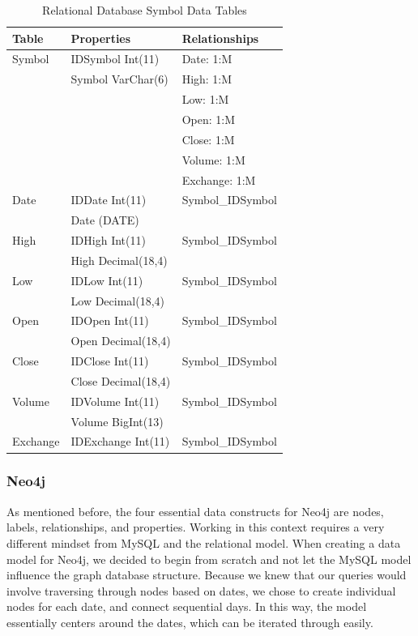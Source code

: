 \documentclass{IEEEtran}
\begin{document}
\begin{table}
	\centering
	\caption{Relational Database Symbol Data Tables}
	\label{tab:relational_data}
\begin{tabular}{lll} \hline \hline
\textbf{Table} & \textbf{Properties} & \textbf{Relationships} \\ \hline
Symbol & IDSymbol Int(11) & Date: 1:M \\
& Symbol VarChar(6) & High: 1:M \\ 
& & Low: 1:M \\ 
& & Open: 1:M \\
& & Close: 1:M \\
& & Volume: 1:M \\ 
& & Exchange: 1:M \\ \hline
Date & IDDate Int(11) & Symbol\_IDSymbol \\
& Date (DATE) & \\ \hline
High & IDHigh Int(11) & Symbol\_IDSymbol \\
& High Decimal(18,4) & \\ \hline
Low & IDLow Int(11) & Symbol\_IDSymbol \\
& Low Decimal(18,4) & \\ \hline
Open & IDOpen Int(11) & Symbol\_IDSymbol \\
& Open Decimal(18,4) & \\ \hline
Close & IDClose Int(11) & Symbol\_IDSymbol \\
& Close Decimal(18,4) & \\ \hline
Volume & IDVolume Int(11) & Symbol\_IDSymbol \\
& Volume BigInt(13) & \\ \hline
Exchange & IDExchange Int(11) & Symbol\_IDSymbol \\ \hline \hline
\end{tabular}
\end{table}

\subsubsection{Neo4j}

As mentioned before, the four essential data constructs for Neo4j are nodes, labels, relationships, and properties. Working in this context requires a very different mindset from MySQL and the relational model. When creating a data model for Neo4j, we decided to begin from scratch and not let the MySQL model influence the graph database structure. Because we knew that our queries would involve traversing through nodes based on dates, we chose to create individual nodes for each date, and connect sequential days. In this way, the model essentially centers around the dates, which can be iterated through easily.  
\end{document}
